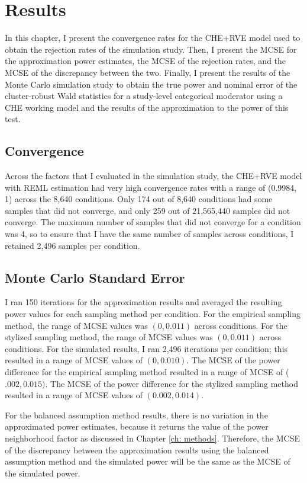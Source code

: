 \chapter{Results}\label{ch: results}

In this chapter, I present the convergence rates for the CHE+RVE model used to obtain the rejection rates of the simulation study. Then, I present the MCSE for the approximation power estimates, the MCSE of the rejection rates, and the MCSE of the discrepancy between the two. Finally, I present the results of the Monte Carlo simulation study to obtain the true power and nominal error of the cluster-robust Wald statistics for a study-level categorical moderator using a CHE working model and the results of the approximation to the power of this test.  

\section{Convergence}

Across the factors that I evaluated in the simulation study, the CHE+RVE model with REML estimation had very high convergence rates with a range of (0.9984, 1) across the 8,640 conditions. Only 174 out of 8,640 conditions had some samples that did not converge, and only 259 out of 21,565,440 samples did not converge. The maximum number of samples that did not converge for a condition was 4, so to ensure that I have the same number of samples across conditions, I retained 2,496 samples per condition. 

\section{Monte Carlo Standard Error}

I ran 150 iterations for the approximation results and averaged the resulting power values for each sampling method per condition. For the empirical sampling method, the range of MCSE values was $(0, 0.011)$ across conditions. For the stylized sampling method, the range of MCSE values was $(0, 0.011)$ across conditions. For the simulated results, I ran 2,496 iterations per condition; this resulted in a range of MCSE values of $(0, 0.010)$. The MCSE of the power difference for the empirical sampling method resulted in a range of MCSE of ($.002,  0.015)$. The MCSE of the power difference for the stylized sampling method resulted in a range of MCSE values of $(0.002, 0.014)$.

For the balanced assumption method results, there is no variation in the approximated power estimates, because it returns the value of the power neighborhood factor as discussed in Chapter \ref{ch: methods}. Therefore, the MCSE of the discrepancy between the approximation results using the balanced assumption method and the simulated power will be the same as the MCSE of the simulated power. 

